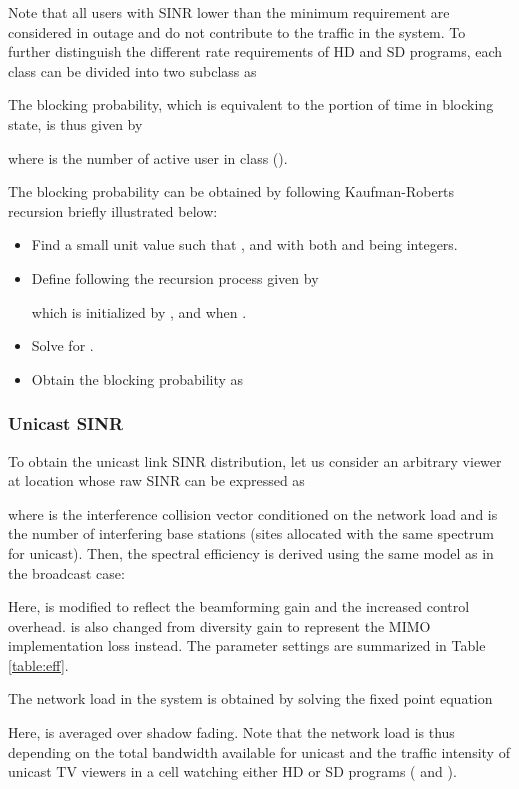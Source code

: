 \documentclass[journal]{IEEEtran}
\begin{document}
Note that all users with SINR lower than the minimum requirement are considered in outage and do not contribute to the traffic in the system.
To further distinguish the different rate requirements of HD and SD programs, each class can be divided into two subclass as

The blocking probability, which is equivalent to the portion of time in blocking state, is thus given by

where  is the number of active user in class  ().

The blocking probability can be obtained by following Kaufman-Roberts recursion \cite{Roberts} briefly illustrated below:
\begin{itemize}
  \item Find a small unit value  such that ,  and  with both  and  being integers.
  \item Define  following the recursion process given by
      
which is initialized by , and  when .
  \item Solve  for .
  \item Obtain the blocking probability as
  
\end{itemize}


\subsubsection{\textbf{Unicast SINR}}
To obtain the unicast link SINR distribution, let us consider an arbitrary viewer at location  whose raw SINR can be expressed as

where  is the interference collision vector conditioned on the network load  and  is the number of interfering base stations (sites allocated with the same spectrum for unicast). Then, the spectral efficiency is derived using the same model as in the broadcast case:

Here,  is modified to reflect the beamforming gain and the increased control overhead.  is also changed from diversity gain to represent the MIMO implementation loss instead. The parameter settings are summarized in Table \ref{table:eff}.

The network load  in the system is obtained by solving the fixed point equation

Here,  is averaged over shadow fading. Note that the network load  is thus depending on the total bandwidth available for unicast  and the traffic intensity of unicast TV viewers in a cell watching either HD or SD programs ( and  ).
\end{document}
